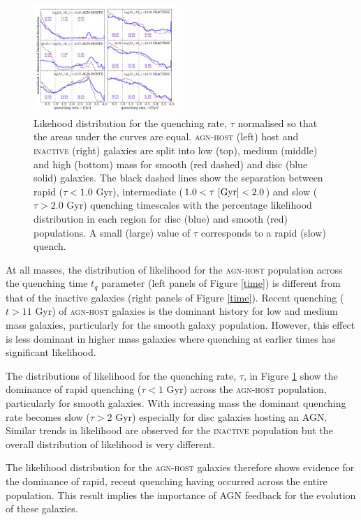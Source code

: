 \documentclass[useAMS,usenatbib]{mn2e}
\begin{document}
\begin{figure}
\includegraphics[width=0.485\textwidth]{quenching_rate_histograms_smooth_red_disc_blue_verticalbpt_seyf_only_hardcut_minimal.pdf}
\caption{Likehood distribution for the quenching rate, $\tau$ normalised so that the areas under the curves are equal. \textsc{agn-host} (left) host and \textsc{inactive} (right) galaxies are split into low (top), medium (middle) and high (bottom) mass for smooth (red dashed) and disc (blue solid) galaxies. The black dashed lines show the separation between rapid ($\tau < 1.0$ Gyr), intermediate ($1.0 < \tau ~\rm{[Gyr]} < 2.0$) and slow ($\tau > 2.0$ Gyr) quenching timescales with the percentage likelihood distribution in each region for disc (blue) and smooth (red) populations. A small (large) value of $\tau$ corresponds to a rapid (slow) quench.}
\label{rate}
\end{figure}


At all masses, the distribution of likelihood for the \textsc{agn-host} population across the quenching time $t_q$ parameter (left panels of Figure \ref{time}) is different from that of the inactive galaxies (right panels of Figure \ref{time}). Recent quenching ($t > 11$ Gyr) of \textsc{agn-host} galaxies is the dominant history for low and medium mass galaxies, particularly for the smooth galaxy population. However, this effect is less dominant in higher mass galaxies where quenching at earlier times has significant likelihood.

The distributions of likelihood for the quenching rate, $\tau$, in Figure \ref{rate} show the dominance of rapid quenching ($\tau < 1$ Gyr) across the \textsc{agn-host} population, particularly for smooth galaxies. With increasing mass the dominant quenching rate becomes slow ($\tau > 2$ Gyr) especially for disc galaxies hosting an AGN. Similar trends in likelihood are observed for the \textsc{inactive} population but the overall distribution of likelihood is very different. 

The likelihood distribution for the \textsc{agn-host} galaxies therefore shows evidence for the dominance of rapid, recent quenching having occurred across the entire population. This result implies the importance of AGN feedback for the evolution of these galaxies.
\end{document}
